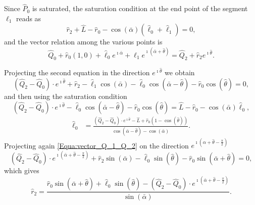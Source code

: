 \documentclass[reqno]{amsart}
\theoremstyle{definition} \newtheorem{definition}{Definition}[section]
\theoremstyle{definition} \newtheorem{remark}[definition]{Remark}
\theoremstyle{plain} \newtheorem{lemma}[definition]{Lemma}
\theoremstyle{plain} \newtheorem{proposition}[definition]{Proposition}
\theoremstyle{plain} \newtheorem{theorem}[definition]{Theorem}
\theoremstyle{plain} \newtheorem{corollary}[definition]{Corollary}
\theoremstyle{definition} \newtheorem{example}[definition]{Example}
\theoremstyle{plain} \newtheorem{claim}[clai]{Claim}
\theoremstyle{definition} \newtheorem{assumption}[definition]{Assumption}
\theoremstyle{definition} \newtheorem{observation}[definition]{Observation}
\newcommand{\1}{\mathbbm 1}
\renewcommand{\i}{\imath}
\numberwithin{equation}{section} %
\theoremstyle{plain} \newtheorem*{theorem*}{Theorem}
\theoremstyle{plain} \newtheorem{mthm}[maintheorem]{Main Theorem}
\theoremstyle{plain} \newtheorem*{mthm*}{Main Theorem}
\theoremstyle{plain} \newtheorem*{conjecture*}{Conjecture}
\theoremstyle{plain} \newtheorem{conjecture}[definition]{Conjecture}
\theoremstyle{plain} \newtheorem*{problem*}{Problem}
\begin{document}
Since $\hat P_0$ is saturated, the saturation condition at the end point of the segment $\ell_1$ reads as
\begin{equation}
\label{Equa:saturation_tent}
\hat r_2 + \hat L - \hat r_0 - \cos(\bar \alpha) (\hat \ell_0 + \hat \ell_1) = 0,
\end{equation}
and the vector relation among the various points is
\begin{equation}
\label{Equa:vector_Q_1_Q_2}
\hat Q_0 + \hat r_0 (1,0) + \hat \ell_0 e^{\i \bar \alpha} + \hat \ell_1 e^{\i (\bar \alpha + \hat \theta)} = \hat Q_2 + \hat r_2 e^{\i \hat \theta}.
\end{equation}

Projecting the second equation in the direction $e^{\i \hat \theta}$ we obtain
\begin{equation*}
(\hat Q_2 - \hat Q_0) \cdot e^{\i \hat \theta} + \hat r_2 - \hat \ell_1 \cos(\bar \alpha) - \hat \ell_0 \cos(\bar \alpha - \hat \theta) - \hat r_0 \cos(\hat \theta) = 0,
\end{equation*}
and then using the saturation condition
\begin{equation*}
(\hat Q_2 - \hat Q_0) \cdot e^{\i \hat \theta} - \hat \ell_0 \cos(\bar \alpha - \hat \theta) - \hat r_0 \cos(\hat \theta) = \hat L - \hat r_0 - \cos(\bar \alpha) \hat \ell_0,
\end{equation*}
\begin{equation*}
\begin{split}
\hat \ell_0 &= \frac{(\hat Q_2 - \hat Q_0) \cdot e^{\i \hat \theta} - \hat L + \hat r_0 (1 - \cos(\hat \theta))}{\cos(\bar \alpha - \hat \theta) - \cos(\bar \alpha)}. %
\end{split}
\end{equation*}
Projecting again \eqref{Equa:vector_Q_1_Q_2} on the direction $e^{\i (\alpha + \hat \theta - \frac{\pi}{2})}$
\begin{equation*}
(\hat Q_2 - \hat Q_0) \cdot e^{\i (\bar \alpha + \hat \theta - \frac{\pi}{2})} + \hat r_2 \sin(\bar \alpha) - \hat \ell_0 \sin(\hat \theta) - \hat r_0 \sin(\bar \alpha + \hat \theta) = 0,
\end{equation*}
which gives
\begin{equation*}
\hat r_2 = \frac{\hat r_0 \sin(\bar \alpha + \hat \theta) + \hat \ell_0 \sin(\hat \theta) - (\hat Q_2 - \hat Q_0) \cdot e^{\i (\bar \alpha + \hat \theta - \frac{\pi}{2})}}{\sin(\bar \alpha)}.
\end{equation*}
\end{document}
